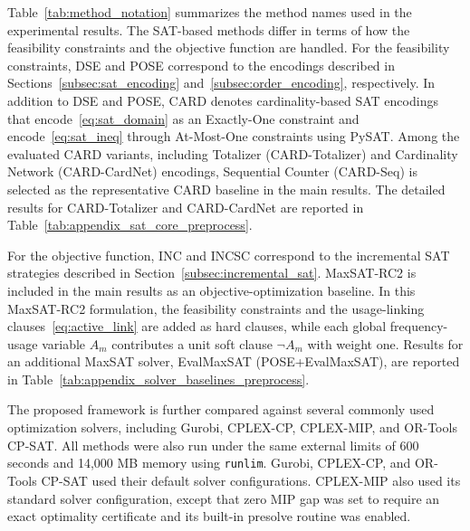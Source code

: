 \documentclass[letterpaper,journal]{IEEEtran}
\begin{document}
Table~\ref{tab:method_notation} summarizes the method names used in the experimental results.
The SAT-based methods differ in terms of how the feasibility constraints and the objective function are handled. For the feasibility constraints, DSE and POSE correspond to the encodings described in Sections~\ref{subsec:sat_encoding} and~\ref{subsec:order_encoding}, respectively.
In addition to DSE and POSE, CARD denotes cardinality-based SAT encodings that encode~\eqref{eq:sat_domain} as an Exactly-One constraint and encode~\eqref{eq:sat_ineq} through At-Most-One constraints using PySAT.
Among the evaluated CARD variants, including Totalizer (CARD-Totalizer) and Cardinality Network (CARD-CardNet) encodings, Sequential Counter (CARD-Seq) is selected as the representative CARD baseline in the main results. The detailed results for CARD-Totalizer and CARD-CardNet are reported in Table~\ref{tab:appendix_sat_core_preprocess}.

For the objective function, INC and INCSC correspond to the incremental SAT strategies described in Section~\ref{subsec:incremental_sat}. 
MaxSAT-RC2 is included in the main results as an objective-optimization baseline.
In this MaxSAT-RC2 formulation, the feasibility constraints and the usage-linking clauses~\eqref{eq:active_link} are added as hard clauses, while each global frequency-usage variable $A_m$ contributes a unit soft clause $\neg A_m$ with weight one. 
Results for an additional MaxSAT solver, EvalMaxSAT (POSE+EvalMaxSAT), are reported in Table~\ref{tab:appendix_solver_baselines_preprocess}.

The proposed framework is further compared against several commonly used optimization solvers, including Gurobi, CPLEX-CP, CPLEX-MIP, and OR-Tools CP-SAT.
All methods were also run under the same external limits of 600 seconds and 14,000 MB memory using \texttt{runlim}. Gurobi, CPLEX-CP, and OR-Tools CP-SAT used their default solver configurations. CPLEX-MIP also used its standard solver configuration, except that zero MIP gap was set to require an exact optimality certificate and its built-in presolve routine was enabled.
\end{document}
